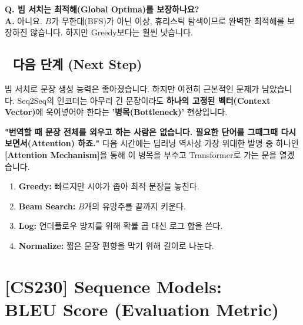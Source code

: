 \documentclass[11pt,a4paper]{book}
\theoremstyle{definition}
\begin{document}
\textbf{Q. 빔 서치는 최적해(Global Optima)를 보장하나요?} \\
\textbf{A.} 아니요. $B$가 무한대(BFS)가 아닌 이상, 휴리스틱 탐색이므로 완벽한 최적해를 보장하진 않습니다. 하지만 Greedy보다는 훨씬 낫습니다.

\section*{🔗 다음 단계 (Next Step)}
빔 서치로 문장 생성 능력은 좋아졌습니다. 하지만 여전히 근본적인 문제가 남았습니다.
Seq2Seq의 인코더는 아무리 긴 문장이라도 \textbf{하나의 고정된 벡터(Context Vector)}에 욱여넣어야 한다는 \textbf{'병목(Bottleneck)'} 현상입니다.

\textbf{"번역할 때 문장 전체를 외우고 하는 사람은 없습니다. 필요한 단어를 그때그때 다시 보면서(Attention) 하죠."}
다음 시간에는 딥러닝 역사상 가장 위대한 발명 중 하나인 \textbf{[Attention Mechanism]}을 통해 이 병목을 부수고 Transformer로 가는 문을 열겠습니다.

\vspace{0.5cm}

\begin{summarybox}[title={단원 요약 (Cheat Sheet)}]
\begin{enumerate}
    \item \textbf{Greedy:} 빠르지만 시야가 좁아 최적 문장을 놓친다.
    \item \textbf{Beam Search:} $B$개의 유망주를 끝까지 키운다.
    \item \textbf{Log:} 언더플로우 방지를 위해 확률 곱 대신 로그 합을 쓴다.
    \item \textbf{Normalize:} 짧은 문장 편향을 막기 위해 길이로 나눈다.
\end{enumerate}
\end{summarybox}


\chapter{[CS230] Sequence Models: \\ BLEU Score (Evaluation Metric)}
\label{ch:lecture48}

\end{document}
